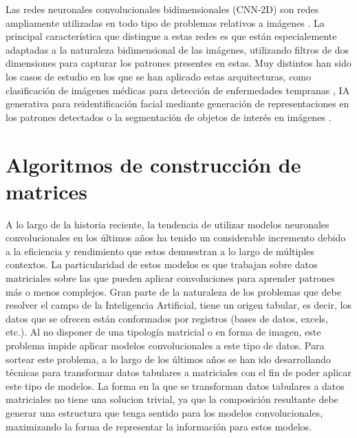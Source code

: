 \documentclass{uathesis-es}
\begin{document}
{	Las redes neuronales convolucionales bidimensionales (CNN-2D) son redes ampliamente utilizadas en todo tipo de problemas relativos a imágenes \cite{9451544}. La principal característica que distingue a estas redes es que están especialemente adaptadas a la naturaleza bidimensional de las imágenes, utilizando filtros de dos dimensiones para capturar los patrones presentes en estas. Muy distintos han sido los casos de estudio en los que se han aplicado estas arquitecturas, como clasificación de imágenes médicas para detección de enfermedades tempranas \cite{7064414}, IA generativa para reidentificación facial \cite{6909616} mediante generación de representaciones en los patrones detectados o la segmentación de objetos de interés en imágenes \cite{long2015fully}.
	
	\section{Algoritmos de construcción de matrices}
	\label{SOAT_MATRIX_ALGORITHM_CONSTRUCTION}
	
	A lo largo de la historia reciente, la tendencia de utilizar modelos neuronales convolucionales en los últimos años ha tenido un considerable incremento debido a la eficiencia y rendimiento que estos demuestran a lo largo de múltiples contextos. La particularidad de estos modelos es que trabajan sobre datos matriciales sobre las que pueden aplicar convoluciones para aprender patrones más o menos complejos. Gran parte de la naturaleza de los problemas que debe resolver el campo de la Inteligencia Artificial, tiene un origen tabular, es decir, los datos que se ofrecen están conformados por registros (bases de datos, excels, etc.). Al no disponer de una tipología matricial o en forma de imagen, este problema impide aplicar modelos convolucionales a este tipo de datos. Para sortear este problema, a lo largo de los últimos años se han ido desarrollando técnicas para transformar datos tabulares a matriciales con el fin de poder aplicar este tipo de modelos. La forma en la que se transforman datos tabulares a datos matriciales no tiene una solucion trivial, ya que la composición resultante debe generar una estructura que tenga sentido para los modelos convolucionales, maximizando la forma de representar la información para estos modelos. 
	
}
\end{document}
